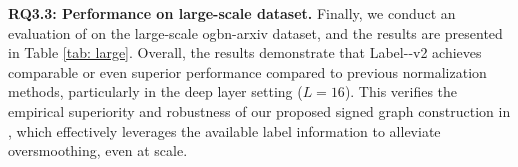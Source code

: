 \textbf{RQ3.3: Performance on large-scale dataset.} 
Finally, we conduct an evaluation of \ours on the large-scale ogbn-arxiv dataset, and the results are presented in Table \ref{tab: large}. 
Overall, the results demonstrate that Label-\ours-v2 achieves comparable or even superior performance compared to previous normalization methods, particularly in the deep layer setting  ($L=16$).
This verifies the empirical superiority and robustness of our proposed signed graph construction in \ours, which effectively leverages the available label information to alleviate oversmoothing, even at scale.
\begin{table}
    \centering
\end{table}
